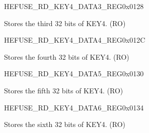 \begin{register}{H}{EFUSE\_RD\_KEY4\_DATA3\_REG}{0x0128}\label{regdesc:EFUSERDKEY4DATA3REG}
%
\regnewline%
\begin{regdesc}\begin{reglist}
\label{fielddesc:EFUSEKEY4DATA3}\item [EFUSE\_KEY4\_DATA3] Stores the third 32 bits of KEY4. (RO)
\end{reglist}\end{regdesc}
\end{register}


\begin{register}{H}{EFUSE\_RD\_KEY4\_DATA4\_REG}{0x012C}\label{regdesc:EFUSERDKEY4DATA4REG}
%
\regnewline%
\begin{regdesc}\begin{reglist}
\label{fielddesc:EFUSEKEY4DATA4}\item [EFUSE\_KEY4\_DATA4] Stores the fourth 32 bits of KEY4. (RO)
\end{reglist}\end{regdesc}
\end{register}


\begin{register}{H}{EFUSE\_RD\_KEY4\_DATA5\_REG}{0x0130}\label{regdesc:EFUSERDKEY4DATA5REG}
%
\regnewline%
\begin{regdesc}\begin{reglist}
\label{fielddesc:EFUSEKEY4DATA5}\item [EFUSE\_KEY4\_DATA5] Stores the fifth 32 bits of KEY4. (RO)
\end{reglist}\end{regdesc}
\end{register}


\begin{register}{H}{EFUSE\_RD\_KEY4\_DATA6\_REG}{0x0134}\label{regdesc:EFUSERDKEY4DATA6REG}
%
\regnewline%
\begin{regdesc}\begin{reglist}
\label{fielddesc:EFUSEKEY4DATA6}\item [EFUSE\_KEY4\_DATA6] Stores the sixth 32 bits of KEY4. (RO)
\end{reglist}\end{regdesc}
\end{register}



